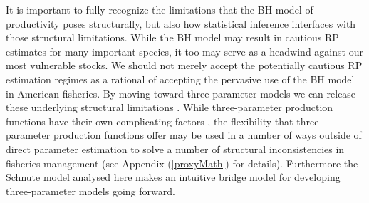 %
It is important to fully recognize the limitations that the BH model of 
productivity poses structurally, but also how statistical inference 
interfaces with those structural limitations. While the BH model may result in 
cautious RP estimates for many important species, it too may serve as a 
headwind against our most vulnerable stocks. We should not merely accept the 
potentially cautious RP estimation regimes as a rational of accepting the 
pervasive use of the BH model in American fisheries.
By moving toward three-parameter models we can release these underlying 
structural limitations \cite{mangel_perspective_2013}.
While three-parameter production functions 
have their own complicating factors \cite{punt_extending_2019}, the flexibility 
that three-parameter production functions offer may be used in a number of ways 
outside of direct parameter estimation to solve a number of structural 
inconsistencies {\color{red}\cite{nickEJ}} in fisheries management (see 
Appendix (\ref{proxyMath}) for details). Furthermore the Schnute model 
analysed here makes an intuitive bridge model for developing three-parameter 
models going forward.

%




